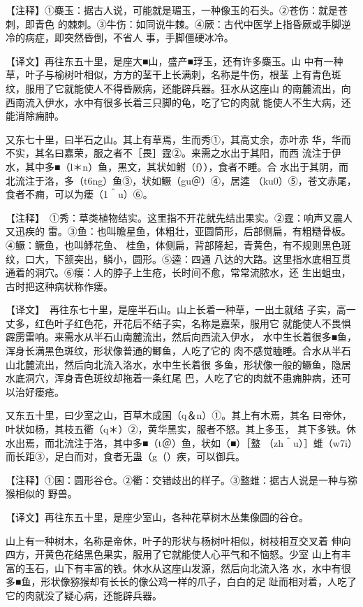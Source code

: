 \documentclass[a4paper,12pt,UTF8,twoside]{ctexbook}
\begin{document}
【注释】①麋玉：据古人说，可能就是瑂玉，一种像玉的石头。②苍伤：就是苍刺，即青色 的棘刺。③牛伤：如同说牛棘。④厥：古代中医学上指昏厥或手脚逆冷的病症，即突然昏倒，不省人 事，手脚僵硬冰冷。

【译文】再往东五十里，是座大■山，盛产■琈玉，还有许多麋玉。山 中有一种草，叶子与榆树叶相似，方方的茎干上长满刺，名称是牛伤，根茎 上有青色斑纹，服用了它就能使人不得昏厥病，还能辟兵器。狂水从这座山 的南麓流出，向西南流入伊水，水中有很多长着三只脚的龟，吃了它的肉就 能使人不生大病，还能消除痈肿。

又东七十里，曰半石之山。其上有草焉，生而秀①，其高丈余，赤叶赤 华，华而不实，其名曰嘉荣，服之者不［畏］霆②。来需之水出于其阳，而西 流注于伊水，其中多■（l＊n）鱼，黑文，其状如鲋（f）），食者不睡。合 水出于其阴，而北流注于洛，多（t6ng）鱼③，状如鳜（gu＠）④，居逵 （ku0）⑤，苍文赤尾，食者不痈，可以为瘘（1＾u）⑥。

【注释】　①秀：草类植物结实。这里指不开花就先结出果实。②霆：响声又震人又迅疾的 雷。③鱼：也叫瞻星鱼，体粗壮，亚圆筒形，后部侧扁，有粗糙骨板。④鳜：鳜鱼，也叫鯚花鱼、 桂鱼，体侧扁，背部隆起，青黄色，有不规则黑色斑纹，口大，下颔突出，鳞小，圆形。⑤逵：四通 八达的大路。这里指水底相互贯通着的洞穴。⑥瘘：人的脖子上生疮，长时间不愈，常常流脓水，还 生出蛆虫，古时把这种病状称作瘘。

【译文】　再往东七十里，是座半石山。山上长着一种草，一出土就结 子实，高一丈多，红色叶子红色花，开花后不结子实，名称是嘉荣，服用它 就能使人不畏惧霹雳雷响。来需水从半石山南麓流出，然后向西流入伊水， 水中生长着很多■鱼，浑身长满黑色斑纹，形状像普通的鲫鱼，人吃了它的 肉不感觉瞌睡。合水从半石山北麓流出，然后向北流入洛水，水中生长着很 多鱼，形状像一般的鳜鱼，隐居水底洞穴，浑身青色斑纹却拖着一条红尾 巴，人吃了它的肉就不患痈肿病，还可以治好瘘疮。

又东五十里，曰少室之山，百草木成囷（q＆n）①。其上有木焉，其名 曰帝休，叶状如杨，其枝五衢（q＊）②，黄华黑实，服者不怒。其上多玉， 其下多铁。休水出焉，而北流注于洛，其中多■（t＠）鱼，状如（■）［盩 （zh＾u）］蜼（w7i）而长距③，足白而对，食者无蛊（g（）疾，可以御兵。

【注释】①囷：圆形谷仓。②衢：交错歧出的样子。③盩蜼：据古人说是一种与猕猴相似的 野兽。

【译文】再往东五十里，是座少室山，各种花草树木丛集像圆的谷仓。

山上有一种树木，名称是帝休，叶子的形状与杨树叶相似，树枝相互交叉着 伸向四方，开黄色花结黑色果实，服用了它就能使人心平气和不恼怒。少室 山上有丰富的玉石，山下有丰富的铁。休水从这座山发源，然后向北流入洛 水，水中有很多■鱼，形状像猕猴却有长长的像公鸡一样的爪子，白白的足 趾而相对着，人吃了它的肉就没了疑心病，还能辟兵器。
\end{document}
